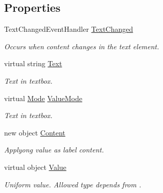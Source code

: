 \subsection*{Properties}
\begin{DoxyCompactItemize}
\item 
Text\+Changed\+Event\+Handler \mbox{\hyperlink{class_wpf_handler_1_1_u_i_1_1_controls_1_1_text_field_control_a402232775f61db3f7b693c1771993324}{Text\+Changed}}
\begin{DoxyCompactList}\small\item\em Occurs when content changes in the text element. \end{DoxyCompactList}\item 
virtual string \mbox{\hyperlink{class_wpf_handler_1_1_u_i_1_1_controls_1_1_text_field_control_a33311103774ab41a0af23f6181ef7d2c}{Text}}
\begin{DoxyCompactList}\small\item\em Text in textbox. \end{DoxyCompactList}\item 
virtual \mbox{\hyperlink{class_wpf_handler_1_1_u_i_1_1_controls_1_1_text_field_control_a99939f3d8500812661376afa5ee1a31d}{Mode}} \mbox{\hyperlink{class_wpf_handler_1_1_u_i_1_1_controls_1_1_text_field_control_a3d56cbedf03f93150117a1d999b828dc}{Value\+Mode}}
\begin{DoxyCompactList}\small\item\em Text in textbox. \end{DoxyCompactList}\item 
new object \mbox{\hyperlink{class_wpf_handler_1_1_u_i_1_1_controls_1_1_text_field_control_ab4b06ba1470f467c920ad28f100a4ae2}{Content}}
\begin{DoxyCompactList}\small\item\em Applyong value as label content. \end{DoxyCompactList}\item 
virtual object \mbox{\hyperlink{class_wpf_handler_1_1_u_i_1_1_controls_1_1_text_field_control_a3ddca328a79686b354a61f609abc163b}{Value}}
\begin{DoxyCompactList}\small\item\em Uniform value. Allowed type depends from . \end{DoxyCompactList}\item 

\end{DoxyCompactItemize}
